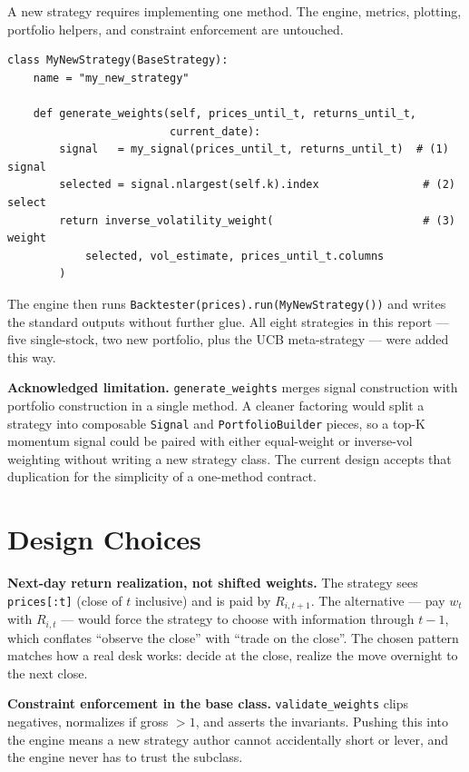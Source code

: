 \documentclass[11pt]{article}
\begin{document}
A new strategy requires implementing one method. The engine, metrics,
plotting, portfolio helpers, and constraint enforcement are untouched.

\begin{small}
\begin{verbatim}
class MyNewStrategy(BaseStrategy):
    name = "my_new_strategy"

    def generate_weights(self, prices_until_t, returns_until_t,
                         current_date):
        signal   = my_signal(prices_until_t, returns_until_t)  # (1) signal
        selected = signal.nlargest(self.k).index                # (2) select
        return inverse_volatility_weight(                       # (3) weight
            selected, vol_estimate, prices_until_t.columns
        )
\end{verbatim}
\end{small}

The engine then runs \texttt{Backtester(prices).run(MyNewStrategy())}
and writes the standard outputs without further glue. All eight
strategies in this report --- five single-stock, two new portfolio,
plus the UCB meta-strategy --- were added this way.

\textbf{Acknowledged limitation.} \texttt{generate\_weights} merges
signal construction with portfolio construction in a single method.
A cleaner factoring would split a strategy into composable
\texttt{Signal} and \texttt{PortfolioBuilder} pieces, so a top-K
momentum signal could be paired with either equal-weight or
inverse-vol weighting without writing a new strategy class. The
current design accepts that duplication for the simplicity of a
one-method contract.

\section{Design Choices}

\textbf{Next-day return realization, not shifted weights.}
The strategy sees \texttt{prices[:t]} (close of $t$ inclusive) and is
paid by $R_{i,t+1}$. The alternative --- pay $w_t$ with $R_{i,t}$ ---
would force the strategy to choose with information through $t-1$,
which conflates ``observe the close'' with ``trade on the close''. The
chosen pattern matches how a real desk works: decide at the close,
realize the move overnight to the next close.

\textbf{Constraint enforcement in the base class.}
\texttt{validate\_weights} clips negatives, normalizes if gross $>1$,
and asserts the invariants. Pushing this into the engine means a new
strategy author cannot accidentally short or lever, and the engine
never has to trust the subclass.
\end{document}

